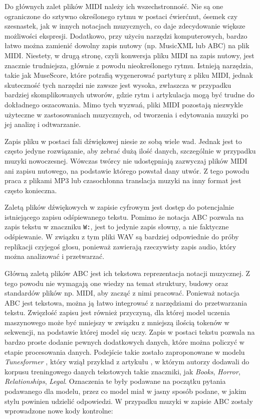 \documentclass[data-science]{agh-wi} %
\begin{document}
Do głównych zalet plików MIDI należy ich wszechstronność. Nie są one ograniczone do sztywno określonego rytmu w postaci ćwierćnut, ósemek czy szesnastek, jak w innych notacjach muzycznych, co daje zdecydowanie większe możliwości ekspresji. Dodatkowo, przy użyciu narzędzi komputerowych, bardzo łatwo można zamienić dowolny zapis nutowy (np. MusicXML lub ABC) na plik MIDI. Niestety, w drugą stronę, czyli konwersja pliku MIDI na zapis nutowy, jest znacznie trudniejsza, głównie z powodu nieokreślonego rytmu. Istnieją narzędzia, takie jak MuseScore, które potrafią wygenerować partyturę z pliku MIDI, jednak skuteczność tych narzędzi nie zawsze jest wysoka, zwłaszcza w przypadku bardziej skomplikowanych utworów, gdzie rytm i artykulacja mogą być trudne do dokładnego oszacowania. Mimo tych wyzwań, pliki MIDI pozostają niezwykle użyteczne w zastosowaniach muzycznych, od tworzenia i edytowania muzyki po jej analizę i odtwarzanie.

Zapis pliku w postaci fali dźwiękowej niesie ze sobą wiele wad. Jednak jest to często jedyne rozwiązanie, aby zebrać dużą ilość danych, szczególnie w przypadku muzyki nowoczesnej. Wówczas twórcy nie udostępniają zazwyczaj plików MIDI ani zapisu nutowego, na podstawie którego powstał dany utwór. Z tego powodu praca z plikami MP3 lub czasochłonna translacja muzyki na inny format jest często konieczna.

Zaletą plików dźwiękowych w zapisie cyfrowym jest dostęp do potencjalnie istniejącego zapisu odśpiewanego tekstu. Pomimo że notacja ABC pozwala na zapis tekstu w znaczniku \texttt{W:}, jest to jedynie zapis słowny, a nie faktyczne odśpiewanie. W związku z tym pliki WAV są bardziej odpowiednie do próby replikacji czyjegoś głosu, ponieważ zawierają rzeczywisty zapis audio, który można analizować i przetwarzać.

Główną zaletą plików ABC jest ich tekstowa reprezentacja notacji muzycznej. Z tego powodu nie wymagają one wiedzy na temat struktury, budowy oraz standardów plików np. MIDI, aby zacząć z nimi pracować. Ponieważ notacja ABC jest tekstowa, można ją łatwo integrować z narzędziami do przetwarzania tekstu. Zwięzłość zapisu jest również przyczyną, dla której model uczenia maszynowego może być mniejszy w związku z mniejszą ilością tokenów w sekwencji, na podstawie której model się uczy. Zapis w postaci tekstu pozwala na bardzo proste dodanie pewnych dodatkowych danych, które można policzyć w etapie procesowania danych. Podejście takie zostało zaproponowane w modelu \textit{Tunesformer} \cite{tunesformer}, który wziął przykład z artykułu \cite{keskarCTRL2019}, w którym autorzy dodawali do korpusu treningowego danych tekstowych takie znaczniki, jak \textit{Books}, \textit{Horror}, \textit{Relationships}, \textit{Legal}. Oznaczenia te były podawane na początku pytania podawanego dla modelu, przez co model miał w jasny sposób podane, w jakim stylu powinien udzielić odpowiedzi. W przypadku muzyki w zapisie ABC zostały wprowadzone nowe kody kontrolne:
\end{document}
